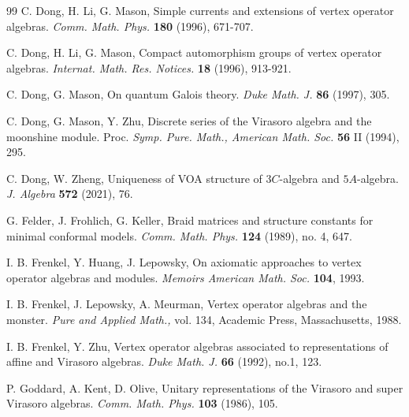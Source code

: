 \documentclass{article}
\begin{document}
\begin{thebibliography}{99}
C. Dong, H. Li, G. Mason, Simple currents and
extensions of vertex operator algebras. \emph{Comm. Math. Phys.} \textbf{180
}(1996), 671-707.

C. Dong, H. Li, G. Mason, Compact automorphism groups of vertex operator algebras.
\emph{Internat. Math. Res. Notices.} \textbf{18
}(1996), 913-921.

 C. Dong, G. Mason, On quantum Galois theory.\emph{
Duke Math. J. }\textbf{86} (1997), 305.

 C. Dong, G. Mason, Y. Zhu, Discrete series of
the Virasoro algebra and the moonshine module. Proc. \emph{Symp. Pure.
Math., American Math. Soc.} \textbf{56} II (1994), 295.


 C. Dong, W. Zheng, Uniqueness of VOA structure of $3C$-algebra and
$5A$-algebra. \emph{J. Algebra
}\textbf{572 }(2021), 76.

 G. Felder, J. Frohlich, G. Keller, Braid matrices
and structure constants for minimal conformal models. \emph{Comm.
Math. Phys.} \textbf{124} (1989), no. 4, 647.

 I. B. Frenkel, Y. Huang, J. Lepowsky, On axiomatic
approaches to vertex operator algebras and modules. \emph{Memoirs
American Math. Soc. }\textbf{104}, 1993.

 I. B. Frenkel, J. Lepowsky, A. Meurman, Vertex
operator algebras and the monster. \emph{Pure and Applied Math., }vol.
134, Academic Press, Massachusetts, 1988.

 I. B. Frenkel, Y. Zhu, Vertex operator algebras
associated to representations of affine and Virasoro algebras. \emph{Duke
Math. J. }\textbf{66 }(1992), no.1, 123.

 P. Goddard, A. Kent, D. Olive, Unitary representations
of the Virasoro and super Virasoro algebras. \emph{Comm. Math. Phys.
}\textbf{103 }(1986), 105.




\end{thebibliography}
\end{document}
